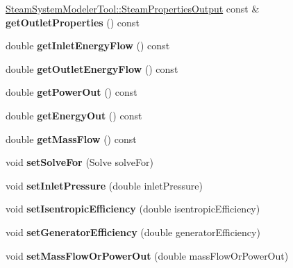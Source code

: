 \begin{DoxyCompactItemize}
\hyperlink{struct_steam_system_modeler_tool_1_1_steam_properties_output}{Steam\+System\+Modeler\+Tool\+::\+Steam\+Properties\+Output} const  \& {\bfseries get\+Outlet\+Properties} () const
\item 
\mbox{\label{class_turbine_ae5d55a7b882e4780d490d43409f8f06c}} 
double {\bfseries get\+Inlet\+Energy\+Flow} () const
\item 
\mbox{\label{class_turbine_aa20c0f9dd81cd9bfd5eda77f588516b5}} 
double {\bfseries get\+Outlet\+Energy\+Flow} () const
\item 
\mbox{\label{class_turbine_a89585cc2fbfdbe67d539eae08c369fa2}} 
double {\bfseries get\+Power\+Out} () const
\item 
\mbox{\label{class_turbine_a143fc660274e0d65ccb8fc55cc2caf83}} 
double {\bfseries get\+Energy\+Out} () const
\item 
\mbox{\label{class_turbine_a4893a203dbbf9db9ca77a0b278c4c118}} 
double {\bfseries get\+Mass\+Flow} () const
\item 
\mbox{\label{class_turbine_a96f54a8fc572dae6c5298289de890f4d}} 
void {\bfseries set\+Solve\+For} (Solve solve\+For)
\item 
\mbox{\label{class_turbine_a04996baab9a40d449a69c737c00be8e4}} 
void {\bfseries set\+Inlet\+Pressure} (double inlet\+Pressure)
\item 
\mbox{\label{class_turbine_ae67daa481ef48bcf8aef84bcccb4611d}} 
void {\bfseries set\+Isentropic\+Efficiency} (double isentropic\+Efficiency)
\item 
\mbox{\label{class_turbine_a51e9c5050a5be51b86dc23e690bd3f40}} 
void {\bfseries set\+Generator\+Efficiency} (double generator\+Efficiency)
\item 
\mbox{\label{class_turbine_a73522631e2eeefa8ea14d5b537e3e760}} 
void {\bfseries set\+Mass\+Flow\+Or\+Power\+Out} (double mass\+Flow\+Or\+Power\+Out)
\item 
\mbox{\label{class_turbine_ab9612657de02e4523492b687917b4091}} 

\end{DoxyCompactItemize}
